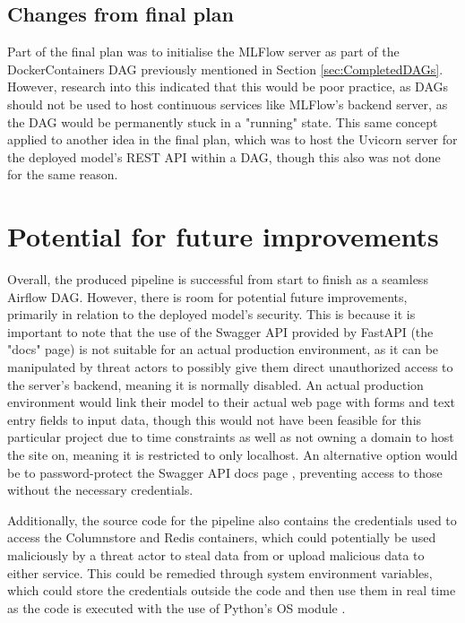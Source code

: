 \documentclass[12pt]{report}
\newcommand{\para}{\vspace{7pt}\noindent}
\begin{document}
\subsection{Changes from final plan}
Part of the final plan was to initialise the MLFlow server as part of the DockerContainers DAG previously 
mentioned in Section \ref{sec:CompletedDAGs}. However, research into this indicated that this would be poor 
practice, as DAGs should not be used to host continuous services \autocite{apache_architecture_nodate} like MLFlow's 
backend server, as the DAG would be permanently stuck in a "running" state. This same concept applied to another 
idea in the final plan, which was to host the Uvicorn server for the deployed model's REST API within a DAG, 
though this also was not done for the same reason.


\section{Potential for future improvements}
Overall, the produced pipeline is successful from start to finish as a seamless Airflow DAG. However, there is room 
for potential future improvements, primarily in relation to the deployed model's security. This is because it is 
important to note that the use of the Swagger API provided by FastAPI (the "docs" page) is not suitable for an actual production 
environment, as it can be manipulated by threat actors to possibly give them direct unauthorized access to the 
server's backend, meaning it is normally disabled. An actual production environment would link their 
model to their actual web page with forms and text entry fields to input data, though this would not 
have been feasible for this particular project due to time constraints as well as not owning a domain 
to host the site on, meaning it is restricted to only localhost. An alternative option would be to password-protect 
the Swagger API docs page \autocite{ray_securing_2023}, preventing access to those without the necessary credentials.

\para Additionally, the source code for the pipeline also contains the credentials used to access the Columnstore 
and Redis containers, which could potentially be used maliciously by a threat actor to steal data from or upload malicious 
data to either service. This could be remedied through system environment variables, which could store the credentials outside 
the code and then use them in real time as the code is executed with the use of Python's OS module \autocite{freecodecamp_python_2023}.  
\end{document}
